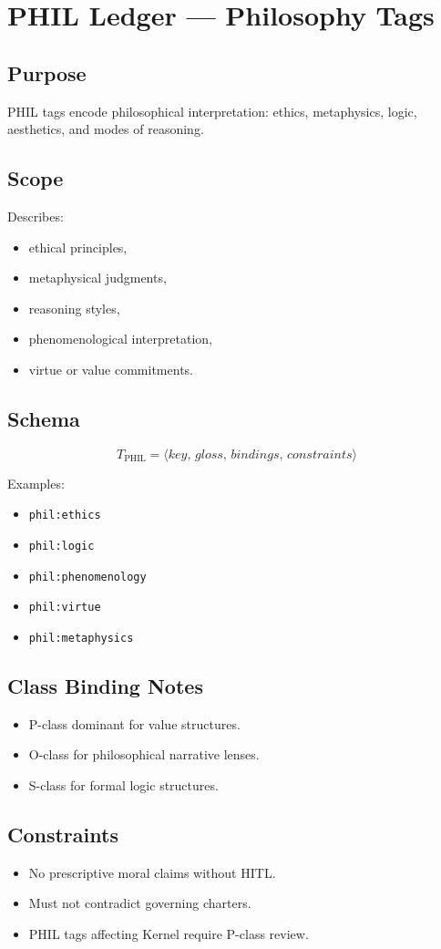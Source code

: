 \chapter{PHIL Ledger --- Philosophy Tags}
\label{chap:PHIL_Ledger}

\section{Purpose}

PHIL tags encode philosophical interpretation: ethics, metaphysics, logic,
aesthetics, and modes of reasoning.

\section{Scope}

Describes:
\begin{itemize}
    \item ethical principles,
    \item metaphysical judgments,
    \item reasoning styles,
    \item phenomenological interpretation,
    \item virtue or value commitments.
\end{itemize}

\section{Schema}

\[
T_{\text{PHIL}} = \langle key,\, gloss,\, bindings,\, constraints \rangle
\]

Examples:
\begin{itemize}
    \item \texttt{phil:ethics}
    \item \texttt{phil:logic}
    \item \texttt{phil:phenomenology}
    \item \texttt{phil:virtue}
    \item \texttt{phil:metaphysics}
\end{itemize}

\section{Class Binding Notes}

\begin{itemize}
    \item P-class dominant for value structures.
    \item O-class for philosophical narrative lenses.
    \item S-class for formal logic structures.
\end{itemize}

\section{Constraints}

\begin{itemize}
    \item No prescriptive moral claims without HITL.
    \item Must not contradict governing charters.
    \item PHIL tags affecting Kernel require P-class review.
\end{itemize}
